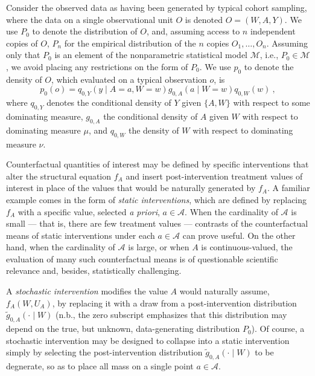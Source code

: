 Consider the observed data as having been generated by typical cohort sampling,
where the data on a single observational unit $O$ is denoted $O = (W, A, Y)$. We
use $P_0$ to denote the distribution of $O$, and, assuming access to $n$
independent copies of $O$, $P_n$ for the empirical distribution of the $n$
copies $O_1, \ldots, O_n$. Assuming only that $P_0$ is an element of the
nonparametric statistical model $\mathcal{M}$, i.e., $P_0 \in \mathcal{M}$, we
avoid placing any restrictions on the form of $P_0$. We use $p_0$ to denote the
density of $O$, which evaluated on a typical observation $o$, is
\begin{equation*}\label{likelihood_factorization}
  p_0(o) = q_{0,Y}(y \mid A = a, W = w) g_{0,A}(a \mid W = w) q_{0,W}(w) \ ,
\end{equation*}
where $q_{0, Y}$ denotes the conditional density of $Y$ given $\{A, W\}$ with
respect to some dominating measure, $g_{0, A}$ the conditional density of $A$
given $W$ with respect to dominating measure $\mu$, and $q_{0, W}$ the density
of $W$ with respect to dominating measure $\nu$.

Counterfactual quantities of interest may be defined by specific interventions
that alter the structural equation $f_A$ and insert post-intervention treatment
values of interest in place of the values that would be naturally generated by
$f_A$. A familiar example comes in the form of \textit{static interventions},
which are defined by replacing $f_A$ with a specific value, selected \textit{a
priori}, $a \in \mathcal{A}$. When the cardinality of $\mathcal{A}$ is small ---
that is, there are few treatment values --- contrasts of the counterfactual
means of static interventions under each $a \in \mathcal{A}$ can prove useful.
On the other hand, when the cardinality of $\mathcal{A}$ is large, or when $A$
is continuous-valued, the evaluation of many such counterfactual means is of
questionable scientific relevance and, besides, statistically challenging.

A \textit{stochastic intervention} modifies the value $A$ would naturally
assume, $f_A(W, U_A)$, by replacing it with a draw from a post-intervention
distribution $\tilde{g}_{0,A}(\cdot \mid W)$ (n.b., the zero subscript
emphasizes that this distribution may depend on the true, but unknown,
data-generating distribution $P_0$). Of course, a stochastic intervention may be
designed to collapse into a static intervention simply by selecting the
post-intervention distribution $\tilde{g}_{0,A}(\cdot \mid W)$ to be degnerate,
so as to place all mass on a single point $a \in \mathcal{A}$.

